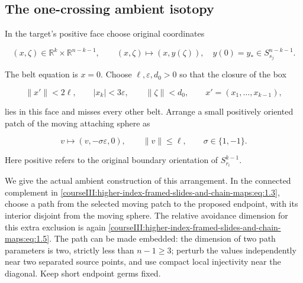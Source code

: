 \subsection{The one-crossing ambient isotopy}
\label{courseIII:higher-index-framed-slides-and-chain-maps:higher-slide-crossing}

\label{courseIII:higher-index-framed-slides-and-chain-maps:section-2}\label{courseIII:higher-slides:2}

In the target's positive face choose original coordinates

\begin{equation}
(x,\zeta)\in\mathbb R^k\times\mathbb R^{n-k-1},
 \qquad
 (x,\zeta)\longmapsto (x,y(\zeta)),
 \quad y(0)=y_*\in S^{n-k-1}_{s_j}.
 \label{courseIII:higher-index-framed-slides-and-chain-maps:eq:2.1}
\end{equation}

The belt equation is \(x=0\). Choose \(\ell,\varepsilon,d_0>0\) so that the closure of the box

\begin{equation}
\|x'\|<2\ell,\qquad |x_k|<3\varepsilon,\qquad
 \|\zeta\|<d_0,\qquad x'=(x_1,\ldots,x_{k-1}),
 \label{courseIII:higher-index-framed-slides-and-chain-maps:eq:2.2}
\end{equation}

lies in this face and misses every other belt. Arrange a small positively oriented patch of the moving attaching sphere as

\begin{equation}
v\longmapsto(v,-\sigma\varepsilon,0),
 \qquad \|v\|\leq\ell,\qquad \sigma\in\{1,-1\}.
 \label{courseIII:higher-index-framed-slides-and-chain-maps:eq:2.3}
\end{equation}

Here positive refers to the original boundary orientation of \(S^{k-1}_{r_i}\).

We give the actual ambient construction of this arrangement. In the connected complement in \eqref{courseIII:higher-index-framed-slides-and-chain-maps:eq:1.3}, choose a path from the selected moving patch to the proposed endpoint, with its interior disjoint from the moving sphere. The relative avoidance dimension for this extra exclusion is again \eqref{courseIII:higher-index-framed-slides-and-chain-maps:eq:1.5}. The path can be made embedded: the dimension of two path parameters is two, strictly less than \(n-1\geq3\); perturb the values independently near two separated source points, and use compact local injectivity near the diagonal. Keep short endpoint germs fixed.

